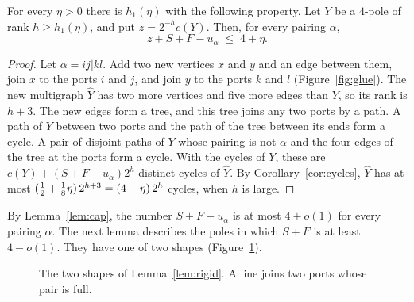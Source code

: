 \begin{lemma}[Cap]\label{lem:cap}
For every $\eta>0$ there is $h_1(\eta)$ with the following property. Let $Y$ be a $4$-pole of
rank $h\ge h_1(\eta)$, and put $z=2^{-h}c(Y)$. Then, for every pairing $\alpha$,
\[
  z+S+F-u_\alpha\;\le\;4+\eta .
\]
\end{lemma}

\begin{proof}
Let $\alpha=ij|kl$. Add two new vertices $x$ and $y$ and an edge between them, join $x$ to the
ports $i$ and $j$, and join $y$ to the ports $k$ and $l$ (Figure~\ref{fig:glue}). The new
multigraph $\hat Y$ has two more vertices and five more edges than $Y$, so its rank is $h+3$. The
new edges form a tree, and this tree joins any two ports by a path. A path of $Y$ between two
ports and the path of the tree between its ends form a cycle. A pair of disjoint paths of $Y$
whose pairing is not $\alpha$ and the four edges of the tree at the ports form a cycle. With the
cycles of $Y$, these are $c(Y)+(S+F-u_\alpha)2^{h}$ distinct cycles of $\hat Y$. By
Corollary~\ref{cor:cycles}, $\hat Y$ has at most $(\tfrac12+\frac18\eta)\,2^{h+3}=(4+\eta)\,2^{h}$
cycles, when $h$ is large.
\end{proof}

By Lemma~\ref{lem:cap}, the number $S+F-u_\alpha$ is at most $4+o(1)$ for every pairing
$\alpha$. The next lemma describes the poles in which $S+F$ is at least $4-o(1)$. They have one
of two shapes (Figure~\ref{fig:shapes}).

\begin{figure}[ht]
\centering
{}
\caption{The two shapes of Lemma~\ref{lem:rigid}. A line joins two ports whose pair is full.}
\label{fig:shapes}
\end{figure}

